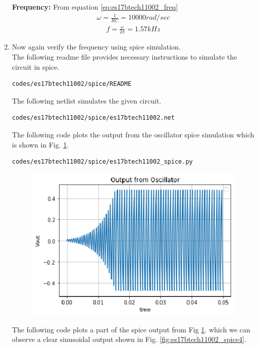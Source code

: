 \begin{enumerate}[label=\arabic*.,ref=\theenumi]
\textbf{Frequency:} From equation \eqref{eq:es17btech11002_freq}
\begin{align}
\omega = \frac{1}{RC} = 10000 rad/sec
\end{align}
\begin{align}
f = \frac{\omega }{2\pi} = 1.57 kHz
\end{align}
\item Now again verify the frequency using spice simulation.\\
\solution The following readme file provides necessary instructions to simulate the circuit in spice.
\begin{lstlisting}
codes/es17btech11002/spice/README
\end{lstlisting}
The following netlist simulates the given circuit.
\begin{lstlisting}
codes/es17btech11002/spice/es17btech11002.net
\end{lstlisting}
The following code plots the output from the oscillator spice simulation which is shown in Fig. \ref{fig:es17btech11002_2_spice}.
\begin{lstlisting}
codes/es17btech11002/spice/es17btech11002_spice.py
\end{lstlisting}
\renewcommand{\thefigure}{\theenumi.\arabic{figure}}
%
\begin{figure}[!ht]
\centering
\includegraphics[width=\columnwidth]{./figs/es17btech11002/es17btech11002_spice.eps}
\caption{}
\label{fig:es17btech11002_2_spice}
\end{figure}
%
The following code plots a part of the spice output from Fig \ref{fig:es17btech11002_2_spice}. which we can observe a clear sinusoidal output shown in Fig. \ref{fig:es17btech11002_spice4}.

\end{enumerate}
